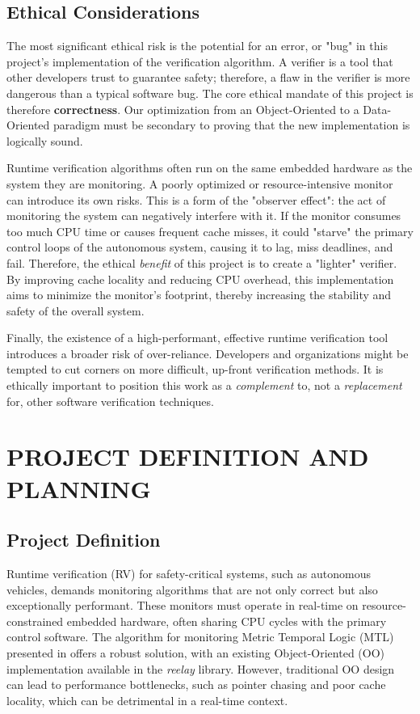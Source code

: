 \documentclass[a4paper,12pt]{report}
\begin{document}
\vspace{1cm}
\section{Ethical Considerations} 

The most significant ethical risk is the potential for an error, or "bug" in this project's implementation of the verification algorithm. A verifier is a tool that other developers trust to guarantee safety; therefore, a flaw in the verifier is more dangerous than a typical software bug.
The core ethical mandate of this project is therefore \textbf{correctness}. Our optimization from an Object-Oriented to a Data-Oriented paradigm must be secondary to proving that the new implementation is logically sound.

Runtime verification algorithms often run on the same embedded hardware as the system they are monitoring. A poorly optimized or resource-intensive monitor can introduce its own risks. This is a form of the "observer effect": the act of monitoring the system can negatively interfere with it. If the monitor consumes too much CPU time or causes frequent cache misses, it could "starve" the primary control loops of the autonomous system, causing it to lag, miss deadlines, and fail. Therefore, the ethical \textit{benefit} of this project is to create a "lighter" verifier. By improving cache locality and reducing CPU overhead, this implementation aims to minimize the monitor's footprint, thereby increasing the stability and safety of the overall system.


Finally, the existence of a high-performant, effective runtime verification tool introduces a broader risk of over-reliance. Developers and organizations might be tempted to cut corners on more difficult, up-front verification methods. It is ethically important to position this work as a \textit{complement} to, not a \textit{replacement} for, other software verification techniques.

\chapter{PROJECT DEFINITION AND PLANNING}
\section{Project Definition}

Runtime verification (RV) for safety-critical systems, such as autonomous vehicles, demands monitoring algorithms that are not only correct but also exceptionally performant. These monitors must operate in real-time on resource-constrained embedded hardware, often sharing CPU cycles with the primary control software. The algorithm for monitoring Metric Temporal Logic (MTL) presented in \cite{Ulus19} offers a robust solution, with an existing Object-Oriented (OO) implementation available in the \textit{reelay} library. However, traditional OO design can lead to performance bottlenecks, such as pointer chasing and poor cache locality, which can be detrimental in a real-time context.
\end{document}
